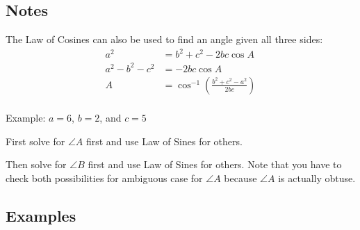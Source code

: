 \documentclass{exam}
\begin{document}
  \subsection{Notes}
  The Law of Cosines can also be used to find an angle given all three sides:
  \begin{align*}
    a^2             & = b^2 + c^2 - 2bc \cos A \\
    a^2 - b^2 - c^2 & = - 2bc \cos A \\
    A               & = \cos^{-1} \left( \frac{b^2 + c^2 - a^2}{2bc} \right) \\
  \end{align*}

  Example: $a = 6$, $b = 2$, and $c = 5$

  \begin{itemize*}
    \item First solve for $\angle A$ first and use Law of Sines for others.
    \item Then solve for $\angle B$ first and use Law of Sines for others.  Note that you have to check both
      possibilities for ambiguous case for $\angle A$ because $\angle A$ is actually obtuse.
  \end{itemize*}

  \subsection{Examples}
\end{document}
